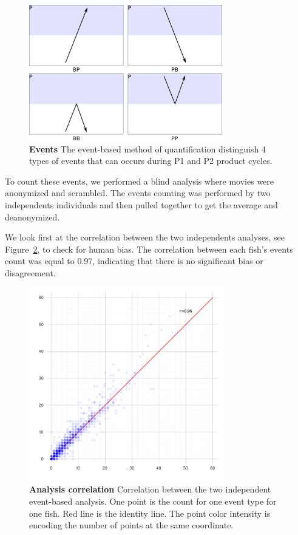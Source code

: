     \begin{figure}[h]
      \centering
      \includegraphics[width=0.75\textwidth]{part_2/assets/events.png}
      \caption{\textbf{Events} The event-based method of quantification distinguish 4 types of events that can occurs during P1 and P2 product cycles.}
      \label{events}
    \end{figure}

  To count these events, we performed a blind analysis where movies were anonymized and scrambled. The events counting was performed by two independents individuals and then pulled together to get the average and deanonymized.

  We look first at the correlation between the two independents analyses, see Figure~\ref{correlation_count}, to check for human bias. The correlation between each fish's events count was equal to 0.97, indicating that there is no significant bias or disagreement.

    \begin{figure}[h]
      \centering
      \includegraphics[width=0.75\textwidth]{part_2/assets/correlation.png}
      \caption{\textbf{Analysis correlation} Correlation between the two independent event-based analysis. One point is the count for one event type for one fish. Red line is the identity line. The point color intensity is encoding the number of points at the same coordinate.}
      \label{correlation_count}
    \end{figure}

